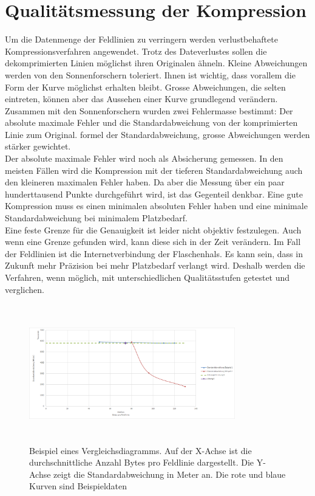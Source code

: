 \section{Qualitätsmessung der Kompression}
Um die Datenmenge der Feldlinien zu verringern werden verlustbehaftete Kompressionsverfahren angewendet. Trotz des Dateverlustes sollen die dekomprimierten Linien möglichst ihren Originalen ähneln. Kleine Abweichungen werden von den Sonnenforschern toleriert. Ihnen ist wichtig, dass vorallem die Form der Kurve möglichst erhalten bleibt. Grosse Abweichungen, die selten eintreten, können aber das Aussehen einer Kurve grundlegend verändern.\\
[\baselineskip]
Zusammen mit den Sonnenforschern wurden zwei Fehlermasse bestimmt: Der absolute maximale Fehler und die Standardabweichung von der komprimierten Linie zum Original. 
formel der Standardabweichung, grosse Abweichungen werden stärker gewichtet.\\
Der absolute maximale Fehler wird noch als Absicherung gemessen. In den meisten Fällen wird die Kompression mit der tieferen Standardabweichung auch den kleineren maximalen Fehler haben. Da aber die Messung über ein paar hunderttausend Punkte durchgeführt wird, ist das Gegenteil denkbar. Eine gute Kompression muss es einen minimalen absoluten Fehler haben und eine minimale Standardabweichung bei minimalem Platzbedarf.\\
[\baselineskip]
Eine feste Grenze für die Genauigkeit ist leider nicht objektiv festzulegen. Auch wenn eine Grenze gefunden wird, kann diese sich in der Zeit verändern. Im Fall der Feldlinien ist die Internetverbindung der Flaschenhals. Es kann sein, dass in Zukunft mehr Präzision bei mehr Platzbedarf verlangt wird. Deshalb werden die Verfahren, wenn möglich, mit unterschiedlichen Qualitätsstufen getestet und verglichen.
\begin{figure}[!htbp]
	\center
	\includegraphics[width=0.8\textwidth,height=6cm,keepaspectratio]{./pictures/testsetup/Beispielgraph.png}
	\caption{Beispiel eines Vergleichsdiagramms. Auf der X-Achse ist die durchschnittliche Anzahl Bytes pro Feldlinie dargestellt. Die Y-Achse zeigt die Standardabweichung in Meter an. Die rote und blaue Kurven sind Beispieldaten}
	\label{testsetup:beispielgraph}
\end{figure} 
